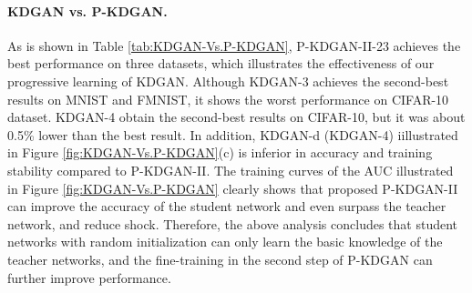 \documentclass{article}
\begin{document}
	\paragraph{KDGAN vs. P-KDGAN.} As is shown in Table \ref{tab:KDGAN-Vs.P-KDGAN}, P-KDGAN-II-\normalsize{\textcircled{\footnotesize{2}}}\normalsize{\textcircled{\footnotesize{3}}} achieves the best performance on three datasets, which illustrates the effectiveness of our progressive learning of KDGAN. Although KDGAN-\normalsize{\textcircled{\footnotesize{3}}} achieves the second-best results on MNIST and FMNIST,  it shows the worst performance on CIFAR-10 dataset. KDGAN-\normalsize{\textcircled{\footnotesize{4}}} obtain the second-best results on CIFAR-10, but it was about 0.5\% lower than the best result. In addition, KDGAN-d (KDGAN-\normalsize{\textcircled{\footnotesize{4}}}) iillustrated in Figure \ref{fig:KDGAN-Vs.P-KDGAN}(c) is inferior in accuracy and training stability compared to P-KDGAN-II. The training curves of the AUC illustrated in Figure \ref{fig:KDGAN-Vs.P-KDGAN} clearly shows that proposed P-KDGAN-II can improve the accuracy of the student network and even surpass the teacher network, and reduce shock. Therefore, the above analysis concludes that student networks with random initialization can only learn the basic knowledge of the teacher networks, and the fine-training in the second step of P-KDGAN can further improve performance.
	
\end{document}
